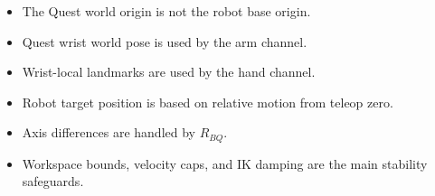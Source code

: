 \documentclass[11pt]{article}
\begin{document}
\begin{itemize}
  \item The Quest world origin is not the robot base origin.
  \item Quest wrist world pose is used by the arm channel.
  \item Wrist-local landmarks are used by the hand channel.
  \item Robot target position is based on relative motion from teleop zero.
  \item Axis differences are handled by $R_{BQ}$.
  \item Workspace bounds, velocity caps, and IK damping are the main stability safeguards.
\end{itemize}
\end{document}
